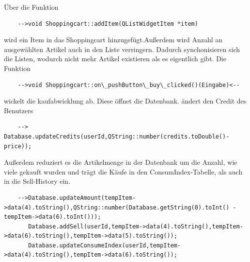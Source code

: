 \documentclass[11pt,a4paper]{article} %
\begin{document}
	Über die Funktion 
	\begin{frame}

\begin{lstlisting}
	-->void Shoppingcart::addItem(QListWidgetItem *item)
		\end{lstlisting}
\end{frame}
	 wird ein Item in das Shoppingcart hinzugefügt.Außerdem wird Anzahl an ausgewählten Artikel auch in den Liste verringern.
	Dadurch synchonisieren sich die Listen, wodurch nicht mehr Artikel existieren als es eigentlich gibt.
	Die Funktion
	\begin{frame}

\begin{lstlisting}
	-->void Shoppingcart::on\_pushButton\_buy\_clicked()(Eingabe)<--
	\end{lstlisting}
\end{frame}
	    wickelt die kaufabwicklung ab. Diese öffnet die Datenbank. ändert den Credit des Benutzers
	    
	\begin{frame}

\begin{lstlisting}
	--> Database.updateCredits(userId,QString::number(credits.toDouble()-price));
	\end{lstlisting}
\end{frame}
	Außerdem reduziert es die Artikelmenge in der Datenbank um die Anzahl, wie viele gekauft wurden und trägt die Käufe in den ConsumIndex-Tabelle, als auch in die Sell-History ein.
	\begin{frame}

\begin{lstlisting}
	-->Database.updateAmount(tempItem->data(4).toString(),QString::number(Database.getString(0).toInt() - tempItem->data(6).toInt()));
	   Database.addSell(userId,tempItem->data(4).toString(),tempItem->data(6).toString(),tempItem->data(5).toString());
       Database.updateConsumeIndex(userId,tempItem->data(4).toString(),tempItem->data(6).toString());
       \end{lstlisting}
\end{frame}
\par	   
\end{document}
